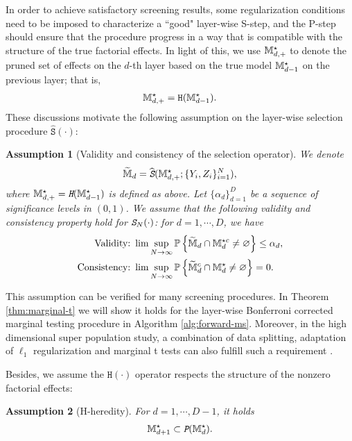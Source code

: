 \documentclass[12pt]{article}
\newtheorem{assumption}{Assumption}
\begin{document}
In order to achieve satisfactory screening results, some regularization conditions need to be imposed to characterize a ``good" layer-wise S-step, and the P-step should ensure that the procedure progress in a way that is compatible with the structure of the true factorial effects.  In light of this, we use ${{\mathbb{M}}}^\star_{d,+}$ to denote the pruned set of effects on the $d$-th layer based on the true model ${\mathbb{M}}_{d-1}^\star$ on the previous layer; that is,
\begin{align*}
    {{\mathbb{M}}}^\star_{d,+} = \texttt{H}({{\mathbb{M}}}^\star_{d-1}).
\end{align*}
These discussions motivate the following assumption on the layer-wise selection procedure $\hat{\texttt{S}}(\cdot)$:
\begin{assumption}[Validity and consistency of the selection operator]\label{asp:valid-consistent}
We denote 
\begin{align*}
    \widetilde{{\mathbb{M}}}_{d} = \widehat{\text{\em \texttt{S}}}({\mathbb{M}}^{\star}_{d,+};\{Y_i,Z_i\}^N_{i=1}),
\end{align*}
where ${\mathbb{M}}^{\star}_{d,+} = \text{\em \texttt{H}}({\mathbb{M}}^{\star}_{d-1})$ is defined as above. Let $\{\alpha_d\}_{d=1}^D$ be a sequence of significance levels in $(0,1)$. We assume that the following \emph{validity} and \emph{consistency} property hold for $\text{\em \texttt{S}}_N(\cdot)$: for $d = 1,\cdots, D$, we have
\begin{align}
    \text{Validity:}&~\lim\sup_{N\to\infty}{\mathbb{P}}\left\{\widetilde{{\mathbb{M}}}_{d}\cap{\mathbb{M}}^{\star c}_d\neq \varnothing\right\}\le \alpha_d,  \label{eqn:validity}\\
    \text{Consistency:}&~\lim\sup_{N\to\infty}{\mathbb{P}}\left\{\widetilde{{\mathbb{M}}}_{d}^c\cap{\mathbb{M}}^{\star}_d\neq \varnothing\right\} = 0.  \label{eqn:consistency}
\end{align}
\end{assumption}


This assumption can be verified for many  screening procedures. In Theorem \ref{thm:marginal-t} we will show it holds for the layer-wise Bonferroni corrected marginal testing procedure in Algorithm \ref{alg:forward-ms}. Moreover, in the high dimensional super population study, a combination of data splitting, adaptation of $\ell_1$ regularization and marginal t tests can also fulfill such a requirement \citep{wasserman2009high}.




Besides, we assume the $\texttt{H}(\cdot)$ operator respects the structure of the nonzero factorial effects:
\begin{assumption}[H-heredity]\label{asp:H-heredity}
For $d=1,\cdots,D-1$, it holds
\begin{align*}
{\mathbb{M}}^\star_{d+1}\subset\texttt{\em P}({\mathbb{M}}^\star_{d}).
\end{align*}
\end{assumption}
\end{document}

